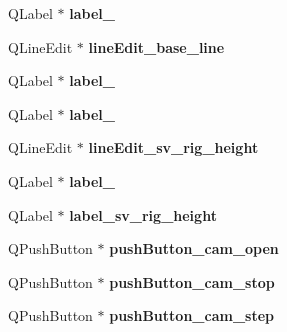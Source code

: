 \begin{DoxyCompactItemize}
\item 
\hypertarget{class_ui___main_window_a9dc4dba26b83e0c94aa566e1c564420b}{}Q\+Label $\ast$ {\bfseries label\+\_}\label{class_ui___main_window_a9dc4dba26b83e0c94aa566e1c564420b}

\item 
\hypertarget{class_ui___main_window_abd7a23e5ef5692a6c53a6f47538afcd5}{}Q\+Line\+Edit $\ast$ {\bfseries line\+Edit\+\_\+base\+\_\+line}\label{class_ui___main_window_abd7a23e5ef5692a6c53a6f47538afcd5}

\item 
\hypertarget{class_ui___main_window_af183bfbfb9f38bbdd60caf92b15e23dc}{}Q\+Label $\ast$ {\bfseries label\+\_}\label{class_ui___main_window_af183bfbfb9f38bbdd60caf92b15e23dc}

\item 
\hypertarget{class_ui___main_window_a663f728e6244926a795c6e6892673b1d}{}Q\+Label $\ast$ {\bfseries label\+\_}\label{class_ui___main_window_a663f728e6244926a795c6e6892673b1d}

\item 
\hypertarget{class_ui___main_window_a89cb298a28a58f568d8048b38733ff3b}{}Q\+Line\+Edit $\ast$ {\bfseries line\+Edit\+\_\+sv\+\_\+rig\+\_\+height}\label{class_ui___main_window_a89cb298a28a58f568d8048b38733ff3b}

\item 
\hypertarget{class_ui___main_window_a4640e3039f2d34e4deb39787925c7d37}{}Q\+Label $\ast$ {\bfseries label\+\_}\label{class_ui___main_window_a4640e3039f2d34e4deb39787925c7d37}

\item 
\hypertarget{class_ui___main_window_a6118b996a4f85be44e94bd62d74df158}{}Q\+Label $\ast$ {\bfseries label\+\_\+sv\+\_\+rig\+\_\+height}\label{class_ui___main_window_a6118b996a4f85be44e94bd62d74df158}

\item 
\hypertarget{class_ui___main_window_abac129cd2a98ad7ea6084617bdd09c82}{}Q\+Push\+Button $\ast$ {\bfseries push\+Button\+\_\+cam\+\_\+open}\label{class_ui___main_window_abac129cd2a98ad7ea6084617bdd09c82}

\item 
\hypertarget{class_ui___main_window_abdce8dd1f86488df9778d1e0c30d607f}{}Q\+Push\+Button $\ast$ {\bfseries push\+Button\+\_\+cam\+\_\+stop}\label{class_ui___main_window_abdce8dd1f86488df9778d1e0c30d607f}

\item 
\hypertarget{class_ui___main_window_a65af8477c0dde07ecd7a9d01cd145bc4}{}Q\+Push\+Button $\ast$ {\bfseries push\+Button\+\_\+cam\+\_\+step}\label{class_ui___main_window_a65af8477c0dde07ecd7a9d01cd145bc4}


\end{DoxyCompactItemize}
